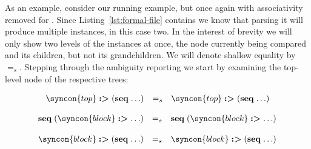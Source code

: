 \documentclass{kththesis}
\begin{document}



As an example, consider our running example, but once again with associativity removed for . Since Listing~\ref{lst:formal-file} contains  we know that parsing it will produce multiple instances, in this case two. In the interest of brevity we will only show two levels of the instances at once, the node currently being compared and its children, but not its grandchildren. We will denote shallow equality by $=_s$. Stepping through the ambiguity reporting we start by examining the top-level node of the respective trees:

$$
\begin{array}{rcl}
\syncon{top} \tagged (\seq \ldots)
& =_s &
\syncon{top} \tagged (\seq \ldots) \\
\end{array}
$$

$$
\begin{array}{rcl}
\seq (\syncon{block} \tagged \ldots)
& =_s &
\seq (\syncon{block} \tagged \ldots) \\
\end{array}
$$

$$
\begin{array}{rcl}
\syncon{block} \tagged (\seq \ldots)
& =_s &
\syncon{block} \tagged (\seq \ldots) \\
\end{array}
$$
\end{document}
